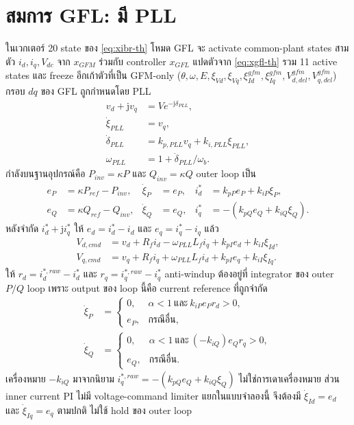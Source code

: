 \documentclass[12pt,a4paper]{article}
\begin{document}
\section{สมการ GFL: มี PLL}

ในเวกเตอร์ 20 state ของ \eqref{eq:xibr-th} โหมด GFL จะ activate common-plant states สามตัว
$i_d,i_q,V_{dc}$ จาก $x_{GFM}$ ร่วมกับ controller $x_{GFL}$ แปดตัวจาก \eqref{eq:xgfl-th}
รวม 11 active states และ freeze อีกเก้าตัวที่เป็น GFM-only ($\theta,\omega,E,\xi_{Vd},\xi_{Vq},
\xi_{Id}^{gfm},\xi_{Iq}^{gfm},V_{d,del}^{gfm},V_{q,del}^{gfm}$)
กรอบ $dq$ ของ GFL ถูกกำหนดโดย PLL
\begin{align}
v_d+\mathrm{j}v_q&=Ve^{-\mathrm{j}\delta_{PLL}},\\
\dot\xi_{PLL}&=v_q,\\
\dot\delta_{PLL}&=k_{p,PLL}v_q+k_{i,PLL}\xi_{PLL},\\
\omega_{PLL}&=1+\dot\delta_{PLL}/\omega_b.
\end{align}
กำลังบนฐานอุปกรณ์คือ $P_{inv}=\kappa P$ และ $Q_{inv}=\kappa Q$ outer loop เป็น
\begin{align}
e_P&=\kappa P_{ref}-P_{inv},&\dot\xi_P&=e_P,&i_d^*&=k_{pP}e_P+k_{iP}\xi_P,\\
e_Q&=\kappa Q_{ref}-Q_{inv},&\dot\xi_Q&=e_Q,&i_q^*&=-(k_{pQ}e_Q+k_{iQ}\xi_Q).
\end{align}
หลังจำกัด $i_d^*+\mathrm{j}i_q^*$ ให้ $e_d=i_d^*-i_d$ และ $e_q=i_q^*-i_q$ แล้ว
\begin{align}
V_{d,cmd}&=v_d+R_fi_d-\omega_{PLL}L_fi_q+k_{pI}e_d+k_{iI}\xi_{Id},\\
V_{q,cmd}&=v_q+R_fi_q+\omega_{PLL}L_fi_d+k_{pI}e_q+k_{iI}\xi_{Iq}.
\end{align}
ให้ $r_d=i_d^{*,raw}-i_d^*$ และ $r_q=i_q^{*,raw}-i_q^*$ anti-windup ต้องอยู่ที่ integrator ของ
outer $P/Q$ loop เพราะ output ของ loop นี้คือ current reference ที่ถูกจำกัด
\begin{align}
\dot\xi_P&=\begin{cases}0,&\alpha<1\ \text{และ}\ k_{iP}e_Pr_d>0,\\e_P,&\text{กรณีอื่น},\end{cases}\\
\dot\xi_Q&=\begin{cases}0,&\alpha<1\ \text{และ}\ (-k_{iQ})e_Qr_q>0,\\e_Q,&\text{กรณีอื่น}.\end{cases}
\end{align}
เครื่องหมาย $-k_{iQ}$ มาจากนิยาม $i_q^{*,raw}=-(k_{pQ}e_Q+k_{iQ}\xi_Q)$ ไม่ใช่การเดาเครื่องหมาย
ส่วน inner current PI ไม่มี voltage-command limiter แยกในแบบจำลองนี้ จึงต้องมี
$\dot\xi_{Id}=e_d$ และ $\dot\xi_{Iq}=e_q$ ตามปกติ ไม่ใช้ hold ของ outer loop
\end{document}
